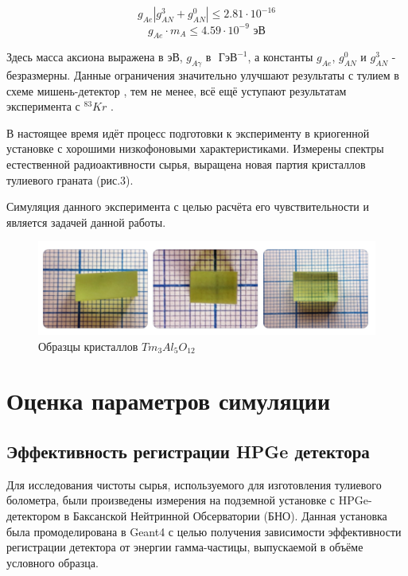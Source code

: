 \documentclass[a4paper,article,14pt]{extarticle}
\begin{document}
\begin{equation}
    {g_{Ae }}\left| {g_{AN}^3 + g_{AN}^0} \right| \leqslant 2.81 \cdot {10^{ - 16}}
\end{equation}
\begin{equation}
{g_{Ae }} \cdot {m_A} \leqslant 4.59 \cdot {10^{ - 9}} \text{ эВ}
\end{equation}

Здесь масса аксиона выражена в эВ, $g_{A\gamma }$ в $\text{ ГэВ}^{-1}$, а константы $g_{Ae }$, $g_{AN}^0$ и  $g_{AN}^3$ - безразмерны. Данные ограничения значительно улучшают результаты с тулием в схеме мишень-детектор \cite{Derbin2009}, тем не менее, всё ещё уступают результатам эксперимента с $^{83}Kr$ \cite{Derbin_2017_Kr}.

В настоящее время идёт процесс подготовки к эксперименту в криогенной установке с хорошими низкофоновыми характеристиками. Измерены спектры естественной радиоактивности сырья, выращена новая партия кристаллов тулиевого граната (рис.3). 

Симуляция данного эксперимента с целью расчёта его чувствительности и является задачей данной работы.





\begin{figure}[h]
    \centering
    \includegraphics[width = 0.75 \textwidth]{images/Crystals.png}
    \caption{Образцы кристаллов $Tm_3Al_5O_{12}$}
    \label{crystals}
\end{figure}


\newpage 

\section{Оценка параметров симуляции}
\subsection{Эффективность регистрации HPGe детектора}

Для исследования чистоты сырья, используемого для изготовления тулиевого болометра, были произведены измерения на подземной установке с HPGe-детектором в Баксанской Нейтринной Обсерватории (БНО). Данная установка была промоделирована в Geant4 с целью получения зависимости эффективности регистрации детектора от энергии гамма-частицы, выпускаемой в объёме условного образца.
\end{document}

